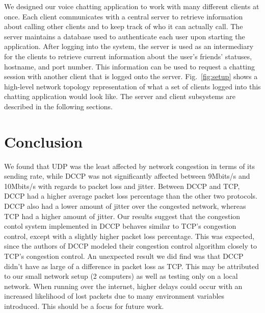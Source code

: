 \documentclass[letterpaper, 9 pt, balance, conference]{ieeeconf}
\begin{document}
We designed our voice chatting application to work with many different clients at once. Each client communicates with a central server to retrieve information about calling other clients and to keep track of who it can actually call. The server maintains a database used to authenticate each user upon starting the application. After logging into the system, the server is used as an intermediary for the clients to retrieve current information about the user's friends' statuses, hostname, and port number. This information can be used to request a chatting session with another client that is logged onto the server.  Fig.~\ref{fig:setup} shows a high-level network topology representation of what a set of clients logged into this chatting application would look like.  The server and client subsystems are described in the following sections.







\section{Conclusion}
\label{sec:concl}

We found that UDP was the least affected by network congestion in terms of its sending rate, while DCCP was not significantly affected between 9Mbits/s and 10Mbits/s with regards to packet loss and jitter.  Between DCCP and TCP, DCCP had a higher average packet loss percentage than the other two protocols. DCCP also had a lower amount of jitter over the congested network, whereas TCP had a higher amount of jitter. Our results suggest that the congestion contol system implemented in DCCP behaves similar to TCP's congestion control, except with a slightly higher packet loss percentage. This was expected, since the authors of DCCP modeled their congestion control algorithm closely to TCP's congestion control. An unexpected result we did find was that DCCP didn't have as large of a difference in packet loss as TCP. This may be attributed to our small network setup (2 computers) as well as testing only on a local network.  When running over the internet, higher delays could occur with an increased likelihood of lost packets due to many environment variables introduced.  This should be a focus for future work.

\balance

\end{document}
